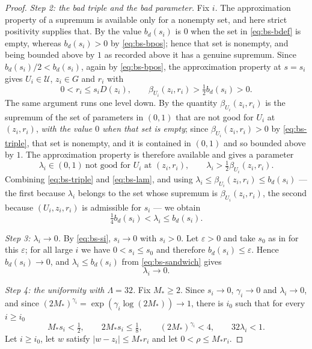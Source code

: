 \begin{proof}
\emph{Step 2: the bad triple and the bad parameter.}
Fix $i$. The approximation property of a supremum is available only for a
nonempty set, and here strict positivity supplies that. By
 the value $b_d(s_i)$ is $0$ when the set in
\eqref{eq:bs-bdef} is empty, whereas $b_d(s_i)>0$ by \eqref{eq:bs-bpos}; hence
that set is nonempty, and being bounded above by $1$ as recorded above it has a
genuine supremum. Since $b_d(s_i)/2<b_d(s_i)$, again by \eqref{eq:bs-bpos}, the
approximation property at $s=s_i$ gives $U_i\in\mathcal U$, $z_i\in G$ and $r_i$
with
\begin{equation}\label{eq:bs-triple}
  0<r_i\le s_iD(z_i),\qquad \beta_{U_i}(z_i,r_i)>\tfrac12b_d(s_i)>0 .
\end{equation}
The same argument runs one level down. By  the quantity
$\beta_{U_i}(z_i,r_i)$ is the supremum of the set of parameters in $(0,1)$ that
are not good for $U_i$ at $(z_i,r_i)$, \emph{with the value $0$ when that set is
empty}; since $\beta_{U_i}(z_i,r_i)>0$ by \eqref{eq:bs-triple}, that set is
nonempty, and it is contained in $(0,1)$ and so bounded above by $1$. The
approximation property is therefore available and gives a parameter
\begin{equation}\label{eq:bs-lam}
  \lambda_i\in(0,1)\ \text{not good for }U_i\text{ at }(z_i,r_i),\qquad
  \lambda_i>\tfrac12\beta_{U_i}(z_i,r_i).
\end{equation}
Combining \eqref{eq:bs-triple} and \eqref{eq:bs-lam}, and using
$\lambda_i\le\beta_{U_i}(z_i,r_i)\le b_d(s_i)$ --- the first because
$\lambda_i$ belongs to the set whose supremum is $\beta_{U_i}(z_i,r_i)$, the
second because $(U_i,z_i,r_i)$ is admissible for $s_i$ --- we obtain
\begin{equation}\label{eq:bs-sandwich}
  \tfrac14b_d(s_i)<\lambda_i\le b_d(s_i).
\end{equation}

\emph{Step 3: $\lambda_i\to0$.}
By \eqref{eq:bs-si}, $s_i\to0$ with $s_i>0$. Let $\varepsilon>0$ and take $s_0$
as in  for this $\varepsilon$; for all large $i$ we have
$0<s_i\le s_0$ and therefore $b_d(s_i)\le\varepsilon$. Hence $b_d(s_i)\to0$, and
$\lambda_i\le b_d(s_i)$ from \eqref{eq:bs-sandwich} gives
\begin{equation}\label{eq:bs-lamzero}
  \lambda_i\longrightarrow0 .
\end{equation}

\emph{Step 4: the uniformity with $\Lambda=32$.}
Fix $M_*\ge2$. Since $s_i\to0$, $\gamma_i\to0$ and $\lambda_i\to0$, and since
$(2M_*)^{\gamma_i}=\exp(\gamma_i\log(2M_*))\to1$, there is $i_0$ such that for
every $i\ge i_0$
\begin{equation}\label{eq:bs-thresholds}
  M_*s_i<\tfrac12,\qquad 2M_*s_i\le\tfrac18,\qquad
  (2M_*)^{\gamma_i}<4,\qquad 32\lambda_i<1 .
\end{equation}
Let $i\ge i_0$, let $w$ satisfy $|w-z_i|\le M_*r_i$ and let
$0<\rho\le M_*r_i$.


\end{proof}
